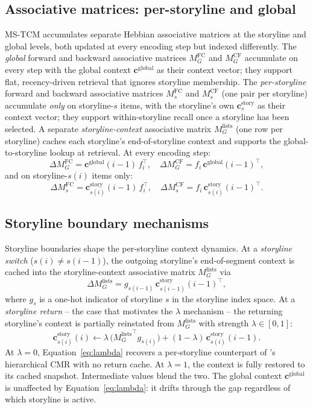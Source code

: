 \documentclass[10pt]{article}
\newcommand{\cstory}{\mathbf{c}^{\mathrm{story}}}
\newcommand{\cglob}{\mathbf{c}^{\mathrm{global}}}
\newcommand{\MCFG}{M^{\mathrm{CF}}_{G}}
\newcommand{\MCFs}{M^{\mathrm{CF}}_{s}}
\newcommand{\MFCG}{M^{\mathrm{FC}}_{G}}
\newcommand{\MFCs}{M^{\mathrm{FC}}_{s}}
\newcommand{\MlistsG}{M^{\mathrm{lists}}_{G}}
\begin{document}
\subsection{Associative matrices: per-storyline and global}
\label{sec:matrices}

MS-TCM accumulates separate Hebbian associative matrices at the
storyline and global levels, both updated at every encoding step but
indexed differently. The \emph{global} forward and backward
associative matrices $\MFCG$ and $\MCFG$ accumulate on every step
with the global context $\cglob$ as their context vector; they
support flat, recency-driven retrieval that ignores storyline
membership. The \emph{per-storyline} forward and backward associative
matrices $\MFCs$ and $\MCFs$ (one pair per storyline) accumulate
\emph{only} on storyline-$s$ items, with the storyline's own
$\cstory_s$ as their context vector; they support
within-storyline recall once a storyline has been selected. A separate
\emph{storyline-context} associative matrix $\MlistsG$ (one row per
storyline) caches each storyline's end-of-storyline context and
supports the global-to-storyline lookup at retrieval. At every
encoding step:
\begin{equation}
\Delta \MFCG = \cglob(i-1)\,f_i^{\top},\quad
\Delta \MCFG = f_i\,\cglob(i-1)^{\top},
\label{eq:global-update}
\end{equation}
and on storyline-$s(i)$ items only:
\begin{equation}
\Delta \MFCs = \cstory_{s(i)}(i-1)\,f_i^{\top},\quad
\Delta \MCFs = f_i\,\cstory_{s(i)}(i-1)^{\top}.
\label{eq:story-update}
\end{equation}

\subsection{Storyline boundary mechanisms}
\label{sec:boundaries}

Storyline boundaries shape the per-storyline context dynamics. At a
\emph{storyline switch} ($s(i)\neq s(i-1)$), the outgoing storyline's
end-of-segment context is cached into the storyline-context
associative matrix $\MlistsG$ via
\begin{equation}
  \Delta\MlistsG = g_{s(i-1)}\,\cstory_{s(i-1)}(i-1)^{\top},
  \label{eq:msc-update}
\end{equation}
where $g_s$ is a one-hot indicator of storyline $s$ in the storyline
index space. At a \emph{storyline return} -- the case that motivates
the $\lambda$ mechanism -- the returning storyline's context is
partially reinstated from $\MlistsG$ with strength
$\lambda \in [0, 1]$:
\begin{equation}
  \cstory_{s(i)}(i) \leftarrow \lambda\,\bigl({\MlistsG}^{\top} g_{s(i)}\bigr) + (1-\lambda)\,\cstory_{s(i)}(i-1).
  \label{eq:lambda}
\end{equation}
At $\lambda = 0$, Equation~\ref{eq:lambda} recovers a per-storyline
counterpart of \citeauthor{CornellZhang2025}'s hierarchical CMR with
no return cache. At $\lambda = 1$, the context is fully restored to
its cached snapshot. Intermediate values blend the two. The global
context $\cglob$ is unaffected by Equation~\ref{eq:lambda}: it drifts
through the gap regardless of which storyline is active.
\end{document}

